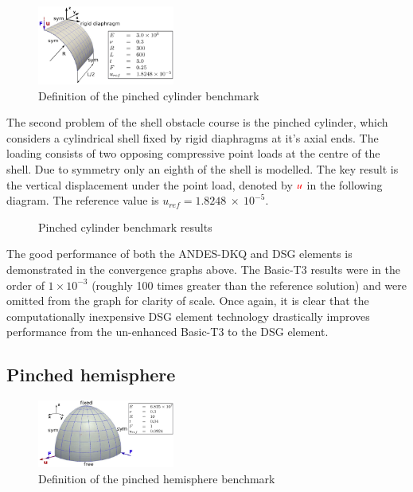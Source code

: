 \begin{figure}
	\centering
	\includegraphics[width=0.4\textwidth]{images/pinchedcylinder.png}
	\caption{Definition of the pinched cylinder benchmark\cite{Bou13}}
\end{figure}

The second problem of the shell obstacle course is the pinched cylinder, which considers a cylindrical shell fixed by rigid diaphragms at it's axial ends. The loading consists of two opposing compressive point loads at the centre of the shell. Due to symmetry only an eighth of the shell is modelled. The key result is the vertical displacement under the point load, denoted by $\textcolor{red}{u}$ in the following diagram. The reference value is $u_{ref} =  1.8248\ \times\ 10^{-5}$. 

 
\begin{figure}[H]
	\caption{\label{ref_label_overall}Pinched cylinder benchmark results}
\end{figure}

 The good performance of both the ANDES-DKQ and DSG elements is demonstrated in the convergence graphs above. The Basic-T3 results were in the order of $1\times10^{-3}$ (roughly 100 times greater than the reference solution) and were omitted from the graph for clarity of scale. Once again, it is clear that the computationally inexpensive DSG element technology drastically improves performance from the un-enhanced Basic-T3 to the DSG element.
\newpage
\subsection{Pinched hemisphere}

\begin{figure}
	\centering
	\includegraphics[width=0.4\textwidth]{images/pinchedhemisphere.png}
	\caption{Definition of the pinched hemisphere benchmark \cite{Bou13}}
\end{figure}

